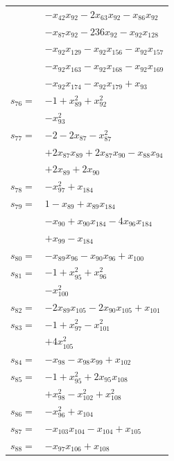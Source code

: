 \begin{longtable}{@{}r@{\;}l@{}}
 & \(\displaystyle -x_{42}x_{92} -2x_{63}x_{92} -x_{86}x_{92}\) \\
 & \(\displaystyle -x_{87}x_{92} -236x_{92} -x_{92}x_{128}\) \\
 & \(\displaystyle -x_{92}x_{129} -x_{92}x_{156} -x_{92}x_{157}\) \\
 & \(\displaystyle -x_{92}x_{163} -x_{92}x_{168} -x_{92}x_{169}\) \\
 & \(\displaystyle -x_{92}x_{174} -x_{92}x_{179} +x_{93}\) \\[3pt]
\(s_{76}=\) & \(\displaystyle -1 +x_{89}^{2} +x_{92}^{2}\) \\
 & \(\displaystyle -x_{93}^{2}\) \\[3pt]
\(s_{77}=\) & \(\displaystyle -2 -2x_{87} -x_{87}^{2}\) \\
 & \(\displaystyle +2x_{87}x_{89} +2x_{87}x_{90} -x_{88}x_{94}\) \\
 & \(\displaystyle +2x_{89} +2x_{90}\) \\[3pt]
\(s_{78}=\) & \(\displaystyle -x_{97}^{2} +x_{184}\) \\[3pt]
\(s_{79}=\) & \(\displaystyle 1 -x_{89} +x_{89}x_{184}\) \\
 & \(\displaystyle -x_{90} +x_{90}x_{184} -4x_{96}x_{184}\) \\
 & \(\displaystyle +x_{99} -x_{184}\) \\[3pt]
\(s_{80}=\) & \(\displaystyle -x_{89}x_{96} -x_{90}x_{96} +x_{100}\) \\[3pt]
\(s_{81}=\) & \(\displaystyle -1 +x_{95}^{2} +x_{96}^{2}\) \\
 & \(\displaystyle -x_{100}^{2}\) \\[3pt]
\(s_{82}=\) & \(\displaystyle -2x_{89}x_{105} -2x_{90}x_{105} +x_{101}\) \\[3pt]
\(s_{83}=\) & \(\displaystyle -1 +x_{97}^{2} -x_{101}^{2}\) \\
 & \(\displaystyle +4x_{105}^{2}\) \\[3pt]
\(s_{84}=\) & \(\displaystyle -x_{98} -x_{98}x_{99} +x_{102}\) \\[3pt]
\(s_{85}=\) & \(\displaystyle -1 +x_{95}^{2} +2x_{95}x_{108}\) \\
 & \(\displaystyle +x_{98}^{2} -x_{102}^{2} +x_{108}^{2}\) \\[3pt]
\(s_{86}=\) & \(\displaystyle -x_{96}^{2} +x_{104}\) \\[3pt]
\(s_{87}=\) & \(\displaystyle -x_{103}x_{104} -x_{104} +x_{105}\) \\[3pt]
\(s_{88}=\) & \(\displaystyle -x_{97}x_{106} +x_{108}\) \\[3pt]

\end{longtable}
